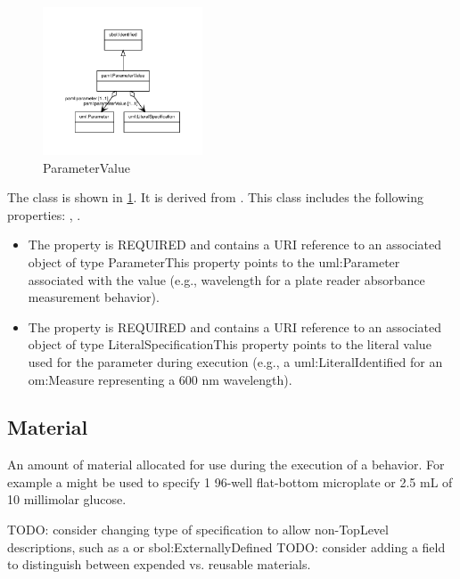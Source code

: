 \begin{figure}[h!]%
\centering%
\includegraphics[width=0.42148936170212764\textwidth]{labop_classes/ParameterValue_abstraction_hierarchy.pdf}%
\caption{ParameterValue}%
\label{fig:ParameterValue}%
\end{figure}

%
The  class is shown in \ref{fig:ParameterValue}. It is derived from .%
This class includes the following properties: , . %
\begin{itemize}%
\item%
The  property is REQUIRED and contains a URI reference to an associated object of type ParameterThis property points to the uml:Parameter associated with the value (e.g., wavelength for a
        plate reader absorbance measurement behavior).%
\item%
The  property is REQUIRED and contains a URI reference to an associated object of type LiteralSpecificationThis property points to the literal value used for the parameter during execution (e.g., a
        uml:LiteralIdentified for an om:Measure representing a 600 nm wavelength).%
\end{itemize}%
\subsection{Material}%
\label{sec:labop:Material}%
An amount of material allocated for use during the execution of a behavior.
        For example a  might be used to specify 1 96-well flat-bottom microplate or 2.5 mL of 10 millimolar glucose.

        TODO: consider changing type of specification to allow non-TopLevel descriptions, such as a  or sbol:ExternallyDefined
        TODO: consider adding a field to distinguish between expended vs. reusable materials.%
\newline%
\linebreak%


